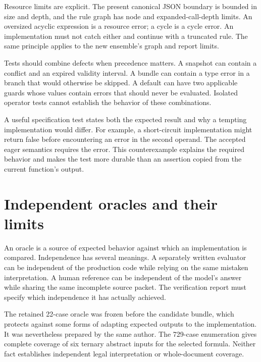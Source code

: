 
Resource limits are explicit. The present canonical JSON boundary is bounded in
size and depth, and the rule graph has node and expanded-call-depth limits. An
oversized acyclic expression is a resource error; a cycle is a cycle error. An
implementation must not catch either and continue with a truncated rule. The
same principle applies to the new ensemble's graph and report limits.

Tests should combine defects when precedence matters. A snapshot can contain a
conflict and an expired validity interval. A bundle can contain a type error in a
branch that would otherwise be skipped. A default can have two applicable guards
whose values contain errors that should never be evaluated. Isolated operator
tests cannot establish the behavior of these combinations.

A useful specification test states both the expected result and why a tempting
implementation would differ. For example, a short-circuit implementation might
return false before encountering an error in the second operand. The accepted
eager semantics requires the error. This counterexample explains the required behavior and
makes the test more durable than an assertion copied from the current function's
output.

\section{Independent oracles and their limits}
\label{merge:M07:05}


An oracle is a source of expected behavior against which an implementation is
compared. Independence has several meanings. A separately written evaluator can
be independent of the production code while relying on the same mistaken
interpretation. A human reference can be independent of the model's answer while
sharing the same incomplete source packet. The verification report must specify
which independence it has actually achieved.

The retained 22-case oracle was frozen before the candidate bundle, which protects
against some forms of adapting expected outputs to the implementation. It was
nevertheless prepared by the same author. The 729-case enumeration gives complete
coverage of six ternary abstract inputs for the selected formula. Neither fact
establishes independent legal interpretation or whole-document coverage.


